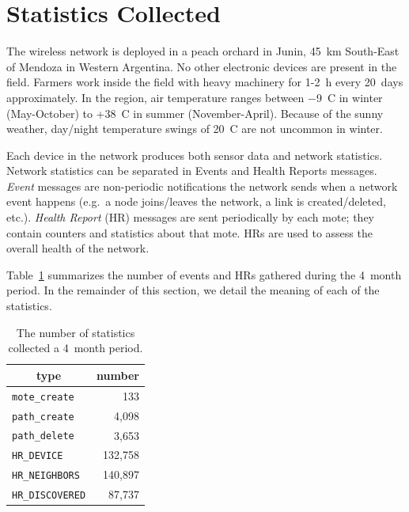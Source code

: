 \documentclass{sig-alternate}
\newcommand{\HRNEIGHBORS}         {{\tt HR\_NEIGHBORS}\xspace}
\newcommand{\HRDISCOVERED}        {{\tt HR\_DISCOVERED}\xspace}
\newcommand{\HRDEVICE}            {{\tt HR\_DEVICE}\xspace}
\newcommand{\pathcreate}          {{\tt path\_create}\xspace}
\newcommand{\pathdelete}          {{\tt path\_delete}\xspace}
\newcommand{\motecreate}          {{\tt mote\_create}\xspace}
\newcommand{\NUMHRNEIGHBORS}      {140,897\xspace}
\begin{document}
\section{Statistics Collected}
\label{sec:collected}


The wireless network is deployed in a peach orchard in Junin, 45~km South-East of Mendoza in Western Argentina.
No other electronic devices are present in the field.
Farmers work inside the field with heavy machinery for 1-2~h every 20~days approximately.
In the region, air temperature ranges between $-$9~C in winter (May-October) to +38~C in summer (November-April).
Because of the sunny weather, day/night temperature swings of 20~C are not uncommon in winter.


Each device in the network produces both sensor data and network statistics.
Network statistics can be separated in Events and Health Reports messages.
\textit{Event} messages are non-periodic notifications the network sends when a network event happens (e.g.~a node joins/leaves the network, a link is created/deleted, etc.).
\textit{Health Report} (HR) messages are sent periodically by each mote; they contain counters and statistics about that mote.
HRs are used to assess the overall health of the network.


Table~\ref{tab:msg_stats} summarizes the number of events and HRs gathered during the 4~month period.
In the remainder of this section, we detail the meaning of each of the statistics.

\begin{table}
    \centering
    \begin{tabular}{|l|r|}
        \hline
        \multicolumn{1}{|c|}{type} & \multicolumn{1}{|c|}{number} \\ \hline
        \hline
        \motecreate     &     133         \\ \hline
        \pathcreate     &   4,098         \\ \hline
        \pathdelete     &   3,653         \\ \hline
        \HRDEVICE       & 132,758         \\ \hline
        \HRNEIGHBORS    & \NUMHRNEIGHBORS \\ \hline
        \HRDISCOVERED   &  87,737         \\ \hline
    \end{tabular}
    \caption{The number of statistics collected a 4~month period.}
    \label{tab:msg_stats}
\end{table}
\end{document}
